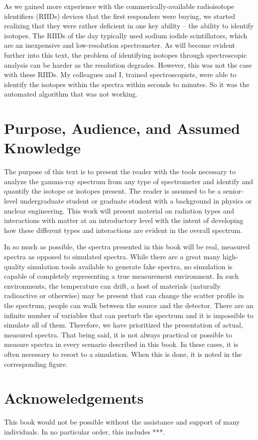 As we gained more experience with the commerically-available radioisotope identifiers (RIIDs) devices that the first responders were buying, we started realizing that they were rather deficient in one key ability -- the ability to identify isotopes.  The RIIDs of the day typically used sodium iodide scintillators, which are an inexpensive and low-resolution spectrometer.  As will become evident further into this text, the problem of identifying isotopes through spectroscopic analysis can be harder as the resolution degrades.  However, this was not the case with these RIIDs.  My colleagues and I, trained spectroscopists, were able to identify the isotopes within the spectra within seconds to minutes.  So it was the automated algorithm that was not working.

\section{Purpose, Audience, and Assumed Knowledge}

The purpose of this text is to present the reader with the tools necessary to analyze the gamma-ray spectrum from any type of spectrometer and identify and quantify the isotope or isotopes present.  The reader is assumed to be a senior-level undergraduate student or graduate student with a background in  physics or nuclear engineering.  This work will present material on radiation types and interactions with matter at an introductory level with the intent of developing how these different types and interactions are evident in the overall spectrum.  

In so much as possible, the spectra presented in this book will be real, measured spectra as opposed to simulated spectra.  While there are a great many high-quality simulation tools available to generate fake spectra, no simulation is capable of completely representing a true measurement environment.  In such environments, the temperature can drift, a host of materials (naturally radioactive or otherwise) may be present that can change the scatter profile in the spectrum, people can walk between the source and the detector.  There are an infinite number of variables that can perturb the spectrum and it is impossible to simulate all of them.  Therefore, we have prioritized the presentation of actual, measured spectra.  That being said, it is not always practical or possible to measure spectra in every scenario described in this book.  In these cases, it is often necessary to resort to a simulation.  When this is done, it is noted in the corresponding figure.

\section{Acknoweledgements}

This book would not be possible without the assistance and support of many individuals.  In no particular order, this includes ***.